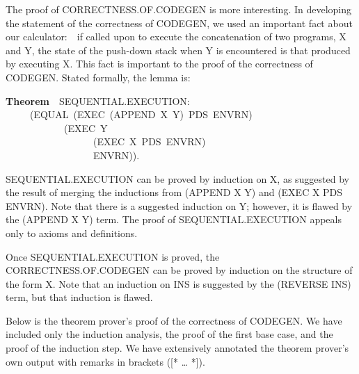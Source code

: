 \documentclass[10pt]{book}
\newenvironment{pubasis}{\begin{flushleft}}{\end{flushleft}}
\newcommand{\axiomordefinition}[1]{\vspace{6pt}\Large\textsf{\textbf{#1}}\normalsize}
\begin{document}
The proof of CORRECTNESS.OF.CODEGEN is more interesting.
In developing the statement of the correctness of CODEGEN, we used an important fact
about our calculator:~~if called upon to execute the concatenation of
two programs, X and Y, the state of the push-down stack when Y is encountered
is   that produced by executing X.  This fact is important
to the proof of the correctness of CODEGEN.  Stated formally, the lemma is:
\begin{pubasis}
\axiomordefinition{Theorem}~~SEQUENTIAL.EXECUTION:\\
~~~~~(EQUAL~(EXEC~(APPEND~X~Y)~PDS~ENVRN)\\
~~~~~~~~~~~~(EXEC~Y\\
~~~~~~~~~~~~~~~~~~(EXEC~X~PDS~ENVRN)\\
~~~~~~~~~~~~~~~~~~ENVRN)).\\
\end{pubasis}
SEQUENTIAL.EXECUTION can be proved by induction on X, as suggested by
the result of merging the inductions from (APPEND X Y) and (EXEC X PDS ENVRN).  Note that there is a suggested
induction on Y; however, it is flawed by the (APPEND X Y) term.
The proof of SEQUENTIAL.EXECUTION appeals only to axioms and
definitions.

Once SEQUENTIAL.EXECUTION is proved, the CORRECTNESS.OF.CODEGEN can be proved
by induction on the structure of the form X.  Note that an induction
on INS is suggested by the (REVERSE INS) term, but that induction is
flawed.

Below is the theorem prover's proof of the correctness of CODEGEN.
We have  included only the induction analysis, the proof of the first
base case, and the proof of the induction step.  We have extensively
annotated the theorem prover's own output with remarks in brackets ([* \ldots{} *]).
\end{document}
